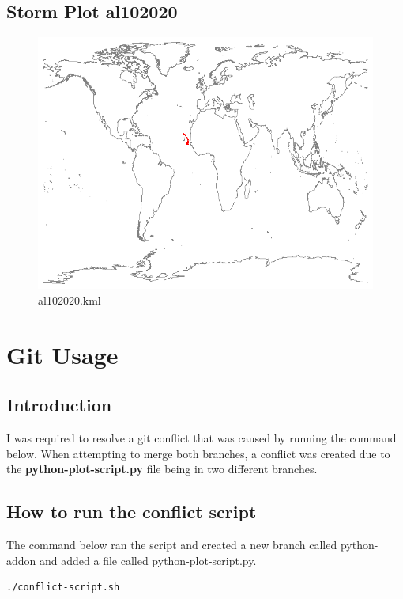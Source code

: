 \documentclass[]{article}
\begin{document}
\clearpage
\subsection{Storm Plot al102020}

\begin{figure}[htbp]
    \centering
\includegraphics{al102020.png}
\caption{al102020.kml}
\label{fig:al102020}
\end{figure}
\clearpage



\section{Git Usage}
\subsection{Introduction}
I was required to resolve a git conflict that was caused by running the command below. When attempting to merge both branches,
a conflict was created due to the \textbf{python-plot-script.py} file being in two different branches.

\subsection{How to run the conflict script}
The command below ran the script and created a new branch called python-addon and added a file called python-plot-script.py.
\begin{tcolorbox}[colback=white, colframe=black, boxrule=1pt, 
    fonttitle=\bfseries, listing only, listing options={language=sh, basicstyle=\ttfamily}]
\begin{verbatim}
./conflict-script.sh
\end{verbatim}
\end{tcolorbox}
\end{document}
